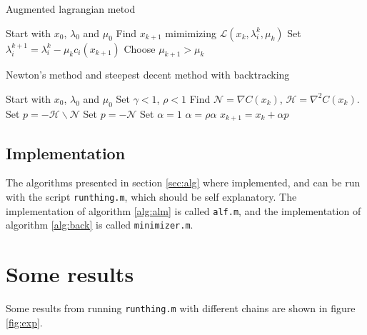 \begin{algorithm} 
\begin{algorithmic} \caption{\cite{ALM}Augmented lagrangian metod} \label{alg:alm} 
\STATE Start with $x_0$, $\lambda_0$ and $\mu_0$
   \STATE Find $x_{k+1}$ mimimizing $\mathcal{L}(x_k,\lambda^k_i,\mu_k)$
   \STATE Set $\lambda_i^{k+1} = \lambda^k_i-\mu_kc_i(x_{k+1})$
    \STATE Choose $ \mu_{k+1} > \mu_k$
\ENDFOR
\end{algorithmic} 
\end{algorithm}


\begin{algorithm}  %
\begin{algorithmic} \caption{\cite{backtracking}Newton's method and steepest decent method with backtracking} \label{alg:back}
\STATE Start with $x_0$, $\lambda_0$ and $\mu_0$
\STATE Set $\gamma < 1$, $\rho < 1$
   \STATE Find $\mathcal{N} = \nabla C(x_k)$, $\mathcal{H} = \nabla^2C(x_k)$.
   \STATE Set $p = -\mathcal{H} \backslash \mathcal{N}$
   	\STATE Set $p = -\mathcal{N}$
   	\ENDIF
    \STATE Set $\alpha = 1$
    \STATE $\alpha = \rho \alpha $
    \ENDWHILE
    \STATE $x_{k+1} = x_{k} + \alpha p$
\ENDFOR
\end{algorithmic} 
\end{algorithm}


\subsection{Implementation}
The algorithms presented in section \ref{sec:alg} where implemented, and can be run with the script \texttt{runthing.m}, which should be self explanatory. The implementation of algorithm \ref{alg:alm} is called \texttt{alf.m}, and the implementation of algorithm \ref{alg:back} is called \texttt{minimizer.m}. 

\section{Some results}
Some results from running \texttt{runthing.m} with different chains are shown in figure \ref{fig:exp}. 

